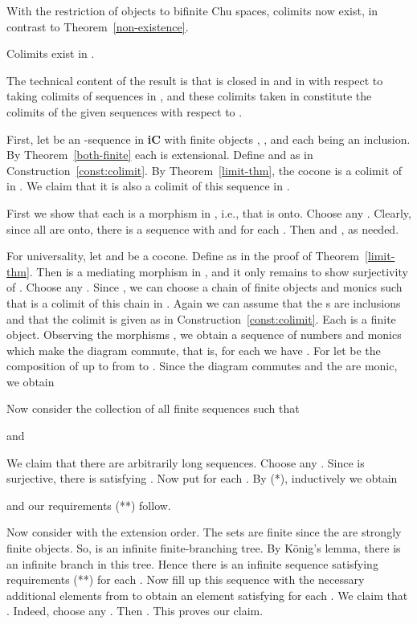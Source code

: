 \documentclass{LMCS}
\let\pf\proof
\begin{document}
With the restriction of objects to bifinite Chu spaces, colimits now
exist, in contrast to Theorem~\ref{non-existence}. 

\begin{thm}\label{thm:colimit-icbif}
  Colimits exist in . 
\end{thm}

The technical content of the result is that  is
closed in  and in  with respect to taking
colimits of sequences in , and these colimits
taken in  constitute the colimits of the given sequences
with respect to . 

\pf First, let  be an
-sequence in \textbf{iC} with finite objects
, , and each
 being an inclusion. By Theorem~\ref{both-finite} each
 is extensional. Define  and
  as in
Construction~\ref{const:colimit}. By Theorem~\ref{limit-thm}, the cocone
 is a colimit of
 in . We claim that
it is also a colimit of this sequence in . 

First we show that each  is a
morphism in , i.e., that  is onto. 
Choose any . Clearly, since all   are onto, there is a sequence  with  and  for each
. Then  and
, as needed. 



For universality, let  and  be
a cocone.  Define  as in the proof
of Theorem~\ref{limit-thm}. Then  is a mediating morphism in
, and it only remains to show surjectivity of . Choose any .  Since , we can choose a chain of finite
objects  and monics  such
that  is a colimit of
this chain in .  Again we can assume that the
s are inclusions and that the colimit  is given as in
Construction~\ref{const:colimit}.  Each  is a finite
object.  Observing the morphisms , we
obtain a sequence of numbers  and monics  which make the diagram commute, that is,
for each  we have .
For  let  be the composition of  up
to  from  to .  Since the
diagram commutes and the  are monic, we obtain



Now consider the collection  of all finite sequences  such that

and


We claim that there are arbitrarily long sequences. Choose any .  Since  is surjective, there is  satisfying . Now put  for each .  By (*),
inductively we obtain

and our requirements (**) follow. 



Now consider  with the extension order. The sets  are finite
since the  are strongly finite objects. 
So,  is an infinite finite-branching tree. By K\"onig's lemma, there is
an infinite  branch in this tree. Hence there is an infinite sequence
 satisfying requirements (**) for each  . Now fill up this sequence
with the necessary additional elements from    to obtain an element
 satisfying 
for each . We claim that . Indeed, choose any . Then
. This proves our claim. 
\end{document}
